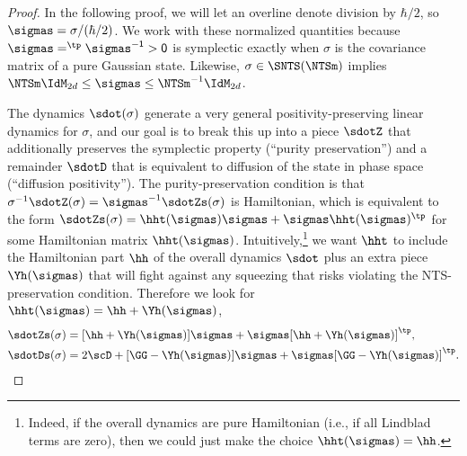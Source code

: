 \documentclass{article}
\numberwithin{equation}{section}
\begin{document}
\begin{proof}

In the following proof, we will let an overline denote division by $\hbar/2$, so $\sigmas = \sigma/(\hbar/2)$. 
We work with these normalized quantities because $\sigmas = \sf^\tp\sigmas^{-1}\sf > 0$ 
is symplectic exactly when $\sigma$ is the covariance matrix of a pure Gaussian state. Likewise, $\sigma\in \SNTS(\NTSm)$ implies $\NTSm \IdM_{2d} \le \sigmas \le \NTSm^{-1} \IdM_{2d} $. 

The dynamics $\sdot(\sigma)$ generate a very general positivity-preserving linear dynamics for $\sigma$, and our goal is to break this up into a piece $\sdotZ$ that additionally preserves the symplectic property (``purity preservation'') and a remainder $\sdotD$ that is equivalent to diffusion of the state in phase space (``diffusion positivity''). The purity-preservation condition is that $\sigma^{-1}\sdotZ(\sigma) = \sigmas^{-1}\sdotZs(\sigma)$ is Hamiltonian, which is equivalent to the form $\sdotZs(\sigma) = \hht(\sigmas)\sigmas + \sigmas \hht(\sigmas)^\tp$ for some Hamiltonian matrix $\hht(\sigmas)$.  Intuitively,\footnote{Indeed, if the overall dynamics are pure Hamiltonian (i.e., if all Lindblad terms are zero), then we could just make the choice $\hht(\sigmas) = \hh$.} we want $\hht$ to include the Hamiltonian part $\hh$ of the overall dynamics $\sdot$ plus an extra piece $\Yh(\sigmas)$ that will fight against any squeezing that risks violating the NTS-preservation condition.  Therefore we look for $\hht(\sigmas) = \hh+\Yh(\sigmas)$,
\begin{align}
    \label{eq:diff-sigma-dot-zero}
    \sdotZs(\sigma) &= [\hh + \Yh(\sigmas)]\sigmas + \sigmas [\hh + \Yh(\sigmas)]^\tp, \\
    \label{eq:diff-sigma-dot-delta}
    \sdotDs (\sigma) &= 2\scD + [\GG -\Yh (\sigmas) ]\sigmas + \sigmas  [\GG - \Yh (\sigmas) ] ^\tp.
\end{align}


\end{proof}
\end{document}
